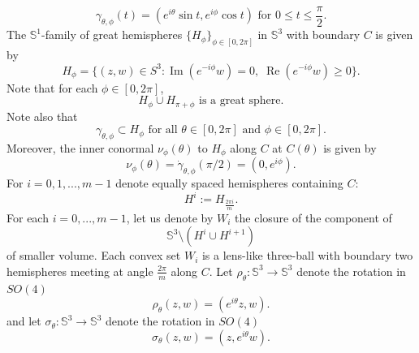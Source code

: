 \documentclass[11pt, reqno]{amsart}
\numberwithin{equation}{section}
\begin{document}
\begin{equation}
\gamma_{\theta,\phi}(t)=(e^{i\theta}\sin t,e^{i\phi}\cos t)\mbox{ for } 0\leq t\leq\frac{\pi}{2}.
\end{equation}
The $\mathbb{S}^1$-family of great hemispheres $\{H_\phi\}_{\phi\in [0,2\pi]}$ in $\mathbb{S}^3$ with boundary $C$ is given by
\begin{equation}
H_\phi =
\{ (z,w) \in S^3 :
\operatorname{Im}(e^{-i\phi} w)=0,\;
\operatorname{Re}(e^{-i\phi} w)\ge 0 \}.
\end{equation}
Note that for each $\phi\in [0,2\pi]$, 
\begin{equation}
H_\phi\cup H_{\pi+\phi}\mbox{ is a great sphere.}
\end{equation}
Note also that \begin{equation}\gamma_{\theta,\phi}\subset H_\phi\mbox{ for all } \theta\in [0,2\pi]\mbox{ and } \phi\in [0,2\pi].\end{equation}
Moreover, the inner conormal $\nu_\phi(\theta)$ to $H_\phi$ along $C$ at $C(\theta)$ is given by 
\begin{equation}
\nu_\phi(\theta) = \dot{\gamma}_{\theta, \phi}(\pi/2)=(0, e^{i\phi}).   
\end{equation}
\noindent
For $i=0,1,...,m-1$ denote equally spaced hemispheres containing $C$:
\begin{equation}
H^i:=H_{\frac{2\pi i}{m}}.
\end{equation}
\noindent
For each $i=0,...,m-1$, let us denote by $W_i$ the closure of the component of \begin{equation}\mathbb{S}^3\setminus (H^i\cup H^{i+1})\end{equation} of smaller volume.  Each convex set $W_i$ is a lens-like three-ball with boundary two hemispheres meeting at angle $\frac{2\pi}{m}$ along $C$.
\noindent
Let $\rho_{\theta}:\mathbb{S}^3\to\mathbb{S}^3$ denote the rotation in $SO(4)$
\begin{equation}
\rho_\theta(z,w)= (e^{i\theta}z,w). 
\end{equation}
and let $\sigma_{\theta}:\mathbb{S}^3\to\mathbb{S}^3$ denote the rotation in $SO(4)$
\begin{equation}
\sigma_\theta(z,w)= (z,e^{i\theta}w). 
\end{equation}

\noindent
\end{document}
